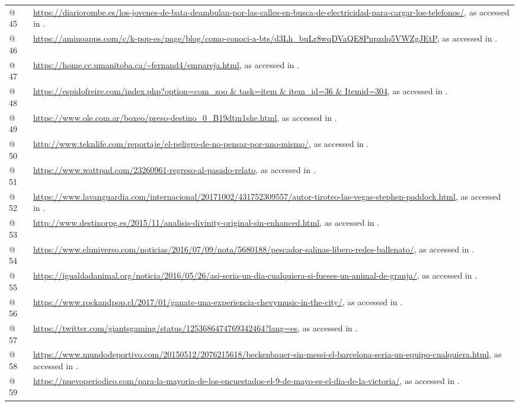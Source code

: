 \documentclass[output=paper]{langscibook}
\begin{document}
\begin{tabularx}{\textwidth}{XX}
@ 45 & \url{https://diariorombe.es/los-jovenes-de-bata-deambulan-por-las-calles-en-busca-de-electricidad-para-cargar-los-telefonos/}, as accessed in \citealt{June2021}.\\
@ 46 & \url{https://aminoapps.com/c/k-pop-es/page/blog/como-conoci-a-bts/d3Lh_buLr8wqDVaQE8Pnpzdq5VWZgJEtP}, as accessed in \citealt{June2021}.\\
@ 47 & \url{https://home.cc.umanitoba.ca/~fernand4/empareja.html}, as accessed in \citealt{Februar2021}.\\
@ 48 & \url{https://espidofreire.com/index.php?option=com_zoo & task=item & item_id=36 & Itemid=304}, as accessed in \citealt{Februar2021}.\\
@ 49 & \url{https://www.ole.com.ar/boxeo/preso-destino_0_B19dtm1she.html}, as accessed in \citealt{Februar2021}.\\
@ 50 & \url{http://www.teknlife.com/reportaje/el-peligro-de-no-pensar-por-uno-mismo/}, as accessed in \citealt{June2021}.\\
@ 51 & \url{https://www.wattpad.com/23260961-regreso-al-pasado-relato}, as accessed in \citealt{Februar2021}.\\
@ 52 & \url{https://www.lavanguardia.com/internacional/20171002/431752309557/autor-tiroteo-las-vegas-stephen-paddock.html}, as accessed in \citealt{Februar2021}.\\
@ 53 & \url{http://www.destinorpg.es/2015/11/analisis-divinity-original-sin-enhanced.html}, as accessed in \citealt{June2021}.\\
@ 54 & \url{https://www.eluniverso.com/noticias/2016/07/09/nota/5680188/pescador-salinas-libero-redes-ballenato/}, as accessed in \citealt{Februar2021}.\\
@ 55 & \url{https://igualdadanimal.org/noticia/2016/05/26/asi-seria-un-dia-cualquiera-si-fueses-un-animal-de-granja/}, as accessed in \citealt{June2021}.\\
@ 56 & \url{https://www.rockandpop.cl/2017/01/ganate-una-experiencia-chevymusic-in-the-city/}, as accessed in \citealt{Februar2012}.\\
@ 57 & \url{https://twitter.com/giantsgaming/status/1253686474769342464?lang=es}, as accessed in \citealt{June2021}.\\
@ 58 & \url{https://www.mundodeportivo.com/20150512/2076215618/beckenbauer-sin-messi-el-barcelona-seria-un-equipo-cualquiera.html}, as accessed in \citealt{Februar2021}.\\
@ 59 & \url{https://nuevoperiodico.com/para-la-mayoria-de-los-encuestados-el-9-de-mayo-es-el-dia-de-la-victoria/}, as accessed in \citealt{June2021}.\\

\end{tabularx}
\end{document}
